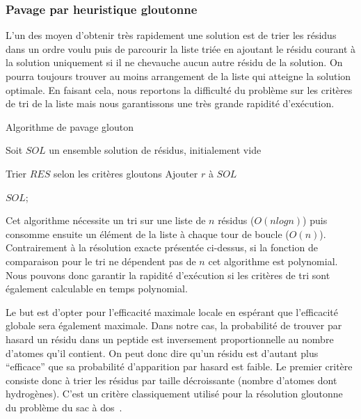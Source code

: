 \subsubsection{Pavage par heuristique gloutonne}

\label{TM_p}

L'un des moyen d'obtenir très rapidement une solution est de trier les résidus dans un ordre voulu puis de parcourir la liste triée en ajoutant le résidu courant à la solution uniquement si il ne chevauche aucun autre résidu de la solution.
On pourra toujours trouver au moins arrangement de la liste qui atteigne la solution optimale.
En faisant cela, nous reportons la difficulté du problème sur les critères de tri de la liste mais nous garantissons une très grande rapidité d'exécution.


\begin{algorithm}[H]
  \caption{Algorithme de pavage glouton}
  Soit $SOL$ un ensemble solution de résidus, initialement vide\;
  
  Trier $RES$ selon les critères gloutons\;
   {
     {
      Ajouter $r$ à $SOL$\;
    }
  }
  
  \KwRet $SOL$;
\end{algorithm}

Cet algorithme nécessite un tri sur une liste de $n$ résidus ($O(n log n)$) puis consomme ensuite un élément de la
liste à chaque tour de boucle ($O(n)$). Contrairement à la résolution exacte présentée ci-dessus, si la fonction de comparaison
pour le tri ne dépendent pas de $n$ cet algorithme est polynomial.
Nous pouvons donc garantir la rapidité d'exécution si les critères de tri sont également calculable en temps polynomial.

Le but est d'opter pour l'efficacité maximale locale en espérant que l'efficacité globale sera également maximale.
Dans notre cas, la probabilité de trouver par hasard un résidu dans un peptide est inversement proportionnelle au nombre d'atomes qu'il contient.
On peut donc dire qu'un résidu est d'autant plus ``efficace'' que sa probabilité d'apparition par hasard est faible.
Le premier critère consiste donc à trier les résidus par taille décroissante (nombre d'atomes dont hydrogènes).
C'est un critère classiquement utilisé pour la résolution gloutonne du problème du sac à dos~\cite{_probleme_2016}.

